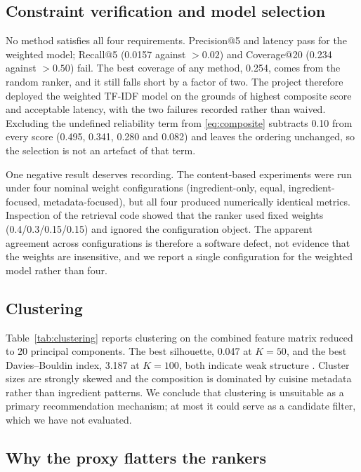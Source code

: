 \documentclass[conference]{IEEEtran}
\begin{document}
\subsection{Constraint verification and model selection}
\label{sec:selection}

No method satisfies all four requirements. Precision@5 and latency pass for the
weighted model; Recall@5 (0.0157 against $>0.02$) and Coverage@20 (0.234 against
$>0.50$) fail. The best coverage of any method, 0.254, comes from the random
ranker, and it still falls short by a factor of two. The project therefore deployed
the weighted TF-IDF model on the grounds of highest composite score and acceptable
latency, with the two failures recorded rather than waived. Excluding the undefined
reliability term from \eqref{eq:composite} subtracts 0.10 from every score (0.495,
0.341, 0.280 and 0.082) and leaves the ordering unchanged, so the selection is not
an artefact of that term.

One negative result deserves recording. The content-based experiments were run
under four nominal weight configurations (ingredient-only, equal, ingredient-
focused, metadata-focused), but all four produced numerically identical metrics.
Inspection of the retrieval code showed that the ranker used fixed weights
(0.4/0.3/0.15/0.15) and ignored the configuration object. The apparent agreement
across configurations is therefore a software defect, not evidence that the weights
are insensitive, and we report a single configuration for the weighted model rather
than four.

\subsection{Clustering}
\label{sec:clustering}

Table~\ref{tab:clustering} reports clustering on the combined feature matrix
reduced to 20 principal components. The best silhouette, 0.047 at $K=50$, and the
best Davies--Bouldin index, 3.187 at $K=100$, both indicate weak structure
\cite{rousseeuw1987}. Cluster sizes are strongly skewed and the composition is
dominated by cuisine metadata rather than ingredient patterns. We conclude that
clustering is unsuitable as a primary recommendation mechanism; at most it could
serve as a candidate filter, which we have not evaluated.



\subsection{Why the proxy flatters the rankers}
\label{sec:bias}
\end{document}
